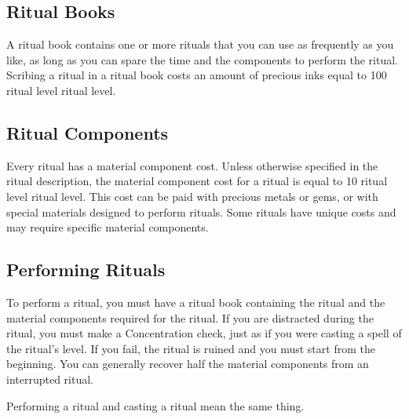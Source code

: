 \subsection{Ritual Books}
A ritual book contains one or more rituals that you can use as frequently as you like, as long as you can spare the time and the components to perform the ritual. Scribing a ritual in a ritual book costs an amount of precious inks equal to 100 \mtimes ritual level \mtimes ritual level.
\subsection{Ritual Components}
Every ritual has a material component cost. Unless otherwise specified in the ritual description, the material component cost for a ritual is equal to 10 \mtimes ritual level \mtimes ritual level. This cost can be paid with precious metals or gems, or with special materials designed to perform rituals. Some rituals have unique costs and may require specific material components.
\subsection{Performing Rituals}
\par To perform a ritual, you must have a ritual book containing the ritual and the material components required for the ritual. If you are distracted during the ritual, you must make a Concentration check, just as if you were casting a spell of the ritual's level. If you fail, the ritual is ruined and you must start from the beginning. You can generally recover half the material components from an interrupted ritual.
\par Performing a ritual and casting a ritual mean the same thing.
